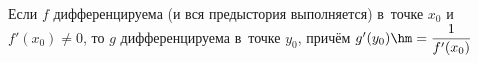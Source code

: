 \label{prob}
    Если $f$ дифференцируема (и вся предыстория выполняется) в~точке $x_0$ и $f'(x_0)\neq 0$, то $g$ дифференцируема в~точке $y_0$, причём $g'(y_0)\hm=\dfrac1{f'(x_0)}$
